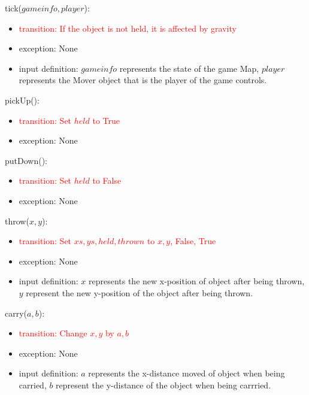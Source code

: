 \documentclass[12pt]{article}
\newcommand{\Implies}{\Rightarrow}
\newcommand{\m}[1]{\mbox{#1}}
\begin{document}
\noindent tick($gameinfo, player$):
\begin{itemize}
    \item \textcolor{red}{transition: If the object is not held, it is affected by gravity}
    \item exception: None
    \item input definition: $gameinfo$ represents the state of the game Map, $player$ represents the Mover object that is the player of the game controls.
\end{itemize}

\noindent pickUp():
\begin{itemize}
    \item \textcolor{red}{transition: Set $held$ to True}
    \item exception: None
\end{itemize}

\noindent putDown():
\begin{itemize}
    \item \textcolor{red}{ transition: Set $held$ to False}
    \item exception: None
\end{itemize}

\noindent throw($x, y$):
\begin{itemize}
    \item \textcolor{red}{transition: Set $xs, ys, held, thrown$ to $x, y$, False, True}
    \item exception: None
    \item input definition: $x$ represents the new x-position of object after being thrown, $y$ represent the new y-position of the object after being thrown. 
\end{itemize}

\noindent carry($a, b$):
\begin{itemize}
    \item \textcolor{red}{transition: Change $x, y$ by $a, b$}
    \item exception: None
    \item input definition: $a$ represents the x-distance moved of object when being carried, $b$ represent the y-distance of the object when being carrried. 
\end{itemize}
\end{document}
